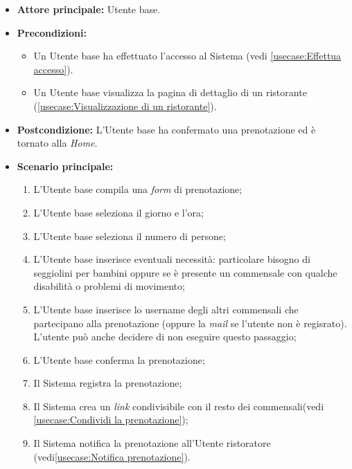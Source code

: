 \label{usecase:Prenotazione di un tavolo}
\begin{itemize}
	\item \textbf{Attore principale:} Utente base.
	\item \textbf{Precondizioni:}
		\begin{itemize}
			\item Un Utente base ha effettuato l'accesso al Sistema (vedi \autoref{usecase:Effettua accesso}).
			\item Un Utente base visualizza la pagina di dettaglio di un ristorante (\autoref{usecase:Visualizzazione di un ristorante}).
		\end{itemize}
	\item \textbf{Postcondizione:} L'Utente base ha confermato una prenotazione ed è tornato alla \textit{Home}.

	      
	\item \textbf{Scenario principale:}
	      \begin{enumerate}
		      \item L'Utente base compila una \textit{form} di prenotazione;
		      \item L'Utente base seleziona il giorno e l'ora;
		      \item L'Utente base seleziona il numero di persone;
		      \item L'Utente base inserisce eventuali necessità: particolare bisogno di seggiolini per bambini oppure se è presente un commensale con qualche disabilità o problemi di movimento;
		      \item L'Utente base inserisce lo username degli altri commensali che partecipano alla prenotazione (oppure la \textit{mail} se l'utente non è regisrato).
			  L'utente può anche decidere di non eseguire questo passaggio;
		      \item L'Utente base conferma la prenotazione;
		      \item Il Sistema registra la prenotazione;
		      \item Il Sistema crea un \textit{link} condivisibile con il resto dei commensali(vedi \autoref{usecase:Condividi la prenotazione});
		      \item Il Sistema notifica la prenotazione all'Utente ristoratore (vedi\autoref{usecase:Notifica prenotazione}).
	      \end{enumerate}


\end{itemize}
